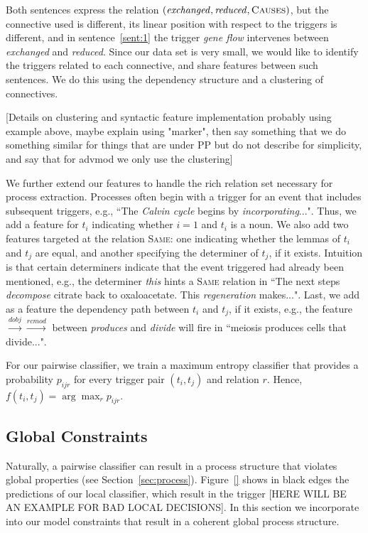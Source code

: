 Both sentences express the relation $(\mbox{\emph{exchanged}},\mbox{\emph{reduced}},\mbox{\textsc{Causes}})$, but the connective used is different, its linear position with respect to the triggers is different, and in sentence~\ref{sent:1} the trigger \emph{gene flow} intervenes between \emph{exchanged} and \emph{reduced}. Since our data set is very small, we would like to identify the triggers related to each connective, and share features between such sentences. We do this using the dependency structure and a clustering of connectives.

[Details on clustering and syntactic feature implementation probably using example above, maybe explain using "marker", then say something that we do something similar for things that are under PP but do not describe for simplicity, and say that for advmod we only use the clustering]

We further extend our features to handle the rich relation set necessary for process extraction. Processes often begin with a trigger for an event that includes subsequent triggers, e.g., ``The \emph{Calvin cycle} begins by \emph{incorporating}...". Thus, we add a feature for $t_i$ indicating whether $i=1$ and $t_i$  is a noun. We also add two features targeted at the relation \textsc{Same}: one indicating whether the lemmas of $t_i$ and $t_j$ are equal, and another specifying the determiner of $t_j$, if it exists. Intuition is that certain determiners indicate that the event triggered had already been mentioned, e.g., the determiner \emph{this} hints a \textsc{Same} relation in ``The next steps \emph{decompose} citrate back to oxaloacetate. This \emph{regeneration} makes...". Last, we add as a feature the dependency path between $t_i$ and $t_j$, if it exists, e.g., the feature $\xrightarrow{\scriptscriptstyle dobj} \xrightarrow{\scriptscriptstyle rcmod}$ between \emph{produces} and \emph{divide} will fire in ``meiosis produces cells that divide...".

For our pairwise classifier, we train a maximum entropy classifier that provides a probability $p_{ijr}$ for every trigger pair $(t_i,t_j)$ and relation $r$. Hence, $f(t_i,t_j)= \arg\max_r p_{ijr}$.

\subsection{Global Constraints} \label{subsec:global}

Naturally, a pairwise classifier can result in a process structure that violates global properties (see Section~\ref{sec:process}). Figure~\ref{} shows in black edges the predictions of our local classifier, which result in the trigger [HERE WILL BE AN EXAMPLE FOR BAD LOCAL DECISIONS]. In this section we incorporate into our model constraints that result in a coherent global process structure.

